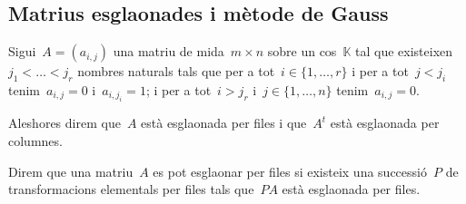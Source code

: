\documentclass[../../main.tex]{subfiles}
\begin{document}
    \subsection{Matrius esglaonades i mètode de Gauss}
    \begin{definition}
        \label{def:matriu esglaonada}
        Sigui~\(A=(a_{i,j})\) una matriu de mida~\(m\times n\) sobre un cos~\(\mathbb{K}\) tal que existeixen~\(j_{1}<\dots<j_{r}\) nombres naturals tals que per a tot~\(i\in\{1,\dots,r\}\) i per a tot~\(j<j_{i}\) tenim~\(a_{i,j}=0\) i~\(a_{i,j_{i}}=1\); i per a tot~\(i>j_{r}\) i~\(j\in\{1,\dots,n\}\) tenim~\(a_{i,j}=0\).

        Aleshores direm que~\(A\) està esglaonada per files i que~\(A^{t}\) està esglaonada per columnes.

        Direm que una matriu~\(A\) es pot esglaonar per files si existeix una successió~\(P\) de transformacions elementals per files tals que~\(PA\) està esglaonada per files.
    \end{definition}
\end{document}
